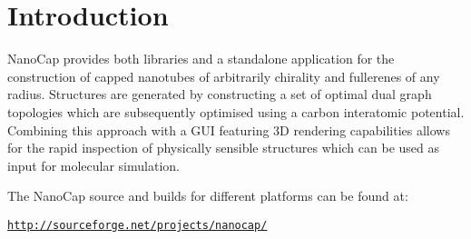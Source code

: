%
%
%

\section{Introduction}


NanoCap provides both libraries and a standalone application for the construction 
of capped nanotubes of arbitrarily chirality and fullerenes of any radius. Structures 
are generated by constructing a set of optimal dual graph topologies which 
are subsequently optimised using a carbon interatomic potential. Combining 
this approach with a GUI featuring 3D rendering capabilities allows for the rapid 
inspection of physically sensible structures which can be used as input for 
molecular simulation. 

The NanoCap source and builds for different platforms can be found at:

\href{http://sourceforge.net/projects/nanocap/}{\texttt{http://sourceforge.net/projects/nanocap/}}

%
